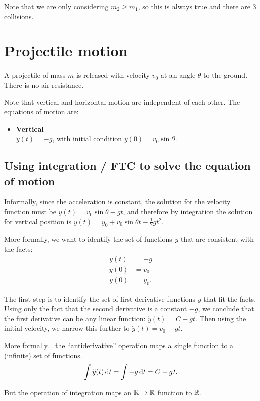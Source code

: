 Note that we are only considering $m_2 \geq m_1$, so this is always true and there are 3 collisions.
\section{Projectile motion}

A projectile of mass $m$ is released with velocity $v_0$ at an angle $\theta$ to the ground. There
is no air resistance.

Note that vertical and horizontal motion are independent of each other. The equations of motion are:

\begin{itemize}
\item {\bf Vertical}\\
  $\ddot{y}(t) = -g$, with initial condition $\dot{y}(0) = v_0\sin\theta$.
\end{itemize}

\subsection{Using integration / FTC to solve the equation of motion}
Informally, since the acceleration is constant, the solution for the velocity function must be
$\dot{y}(t) = v_0\sin\theta - gt$, and therefore by integration the solution for vertical
position is $y(t) = y_0 + v_0\sin\theta t -\frac{1}{2}gt^2$.

More formally, we want to identify the set of functions $y$ that are consistent with the facts:
\begin{align*}
  \ddot{y}(t) &= -g \\
  \dot{y}(0)  &= v_0 \\
  y(0)        &= y_0.
\end{align*}

The first step is to identify the set of first-derivative functions $\dot{y}$ that fit the
facts. Using only the fact that the second derivative is a constant $-g$, we conclude that the
first derivative can be any linear function: $\dot{y}(t) = C - gt$. Then using the initial
velocity, we narrow this further to $\dot{y}(t) = v_0 - gt$.

More formally... the ``antiderivative'' operation maps a single function to a (infinite) set of
functions.
\begin{align*}
  \int \ddot{y}(t) \dt = \int -g \dt = C - gt.
\end{align*}

But the operation of integration maps an $\mathbb{R} \to \mathbb{R}$ function to $\mathbb{R}$.

